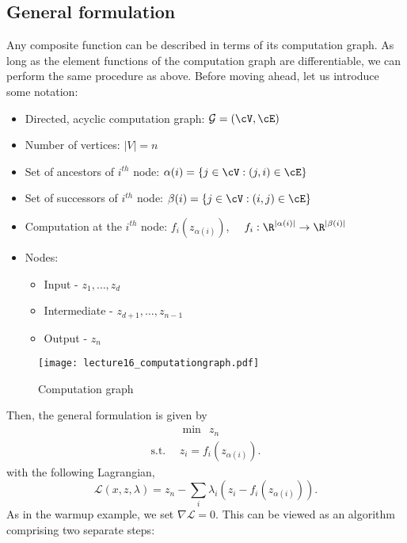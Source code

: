 \subsection{General formulation}
Any composite function can be described in terms of its computation graph. As long as the element functions of the computation graph are differentiable, we can perform the same procedure as above. Before moving ahead, let us introduce some notation: 
\begin{itemize}
\item Directed, acyclic computation graph: $\mathcal{G} = (\cV, \cE)$
\item Number of vertices: $|V| = n$
\item Set of ancestors of $i^{th}$ node: $\alpha(i) = \{ j \in \cV: (j, i) \in \cE\}$
\item Set of successors of $i^{th}$ node: $\beta(i) = \{ j\in \cV: (i, j) \in \cE\}$
\item Computation at the $i^{th}$ node: $f_i(z_{\alpha(i)})$, $\quad f_i: \R^{|\alpha(i)|} \rightarrow \R^{|\beta(i)|}$
\item Nodes:
\begin{itemize}
\item Input - $z_1,\dots,z_ d$
\item Intermediate - $z_{d+1}, \dots, z_{n-1}$
\item Output - $z_n$
\end{itemize}
\end{itemize}

\begin{figure}
 \centering
\texttt{[image: lecture16\_computationgraph.pdf]} 
\label{fig:subim1}
\caption{Computation graph}
\end{figure}
\noindent
Then, the general formulation is given by
\begin{align}
&\min \ \ z_n \\
\text{s.t.} \ \ &z_i = f_i(z_{\alpha(i)}). \nonumber
\end{align}
with the following Lagrangian,
\begin{equation}
\mathcal{L}(x, z, \lambda) = z_n - \sum_{i} \lambda_i (z_i - f_i(z_{\alpha(i)})).
\end{equation}
As in the warmup example, we set $\nabla \mathcal{L} = 0$. This can be viewed as an algorithm comprising two separate steps:
